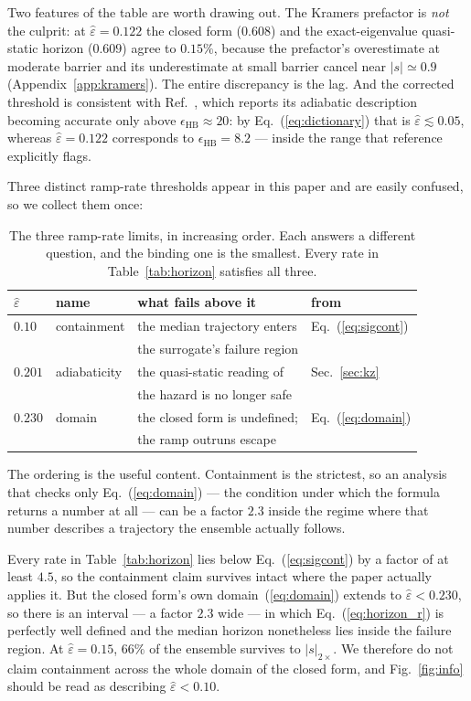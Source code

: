 \documentclass[%
 aip,
 cha,
 amsmath,amssymb,
 reprint,
 superscriptaddress,
 floatfix,
]{revtex4-2}
\newcommand{\Sig}{\hat\varepsilon}
\begin{document}
Two features of the table are worth drawing out.  The Kramers prefactor is \emph{not} the culprit: at $\Sig=0.122$ the closed form ($0.608$) and the exact-eigenvalue quasi-static horizon ($0.609$) agree to $0.15\%$, because the prefactor's overestimate at moderate barrier and its underestimate at small barrier cancel near $|s|\simeq0.9$ (Appendix~\ref{app:kramers}).  The entire discrepancy is the lag.  And the corrected threshold is consistent with Ref.~\cite{HerbertBouchet2017}, which reports its adiabatic description becoming accurate only above $\epsilon_{\mathrm{HB}}\approx20$: by Eq.~(\ref{eq:dictionary}) that is $\Sig\lesssim0.05$, whereas $\Sig=0.122$ corresponds to $\epsilon_{\mathrm{HB}}=8.2$ --- inside the range that reference explicitly flags.

Three distinct ramp-rate thresholds appear in this paper and are easily confused, so we collect them once:
\begin{table}[b]
\caption{\label{tab:thresholds}%
The three ramp-rate limits, in increasing order.  Each answers a different question, and the binding one is the smallest.  Every rate in Table~\ref{tab:horizon} satisfies all three.}
\begin{ruledtabular}
\begin{tabular}{llll}
$\Sig$ & name & what fails above it & from \\
\hline
$0.10$  & containment & the median trajectory enters & Eq.~(\ref{eq:sigcont}) \\
        &             & the surrogate's failure region & \\
$0.201$ & adiabaticity & the quasi-static reading of & Sec.~\ref{sec:kz} \\
        &              & the hazard is no longer safe & \\
$0.230$ & domain & the closed form is undefined; & Eq.~(\ref{eq:domain}) \\
        &        & the ramp outruns escape & \\
\end{tabular}
\end{ruledtabular}
\end{table}
The ordering is the useful content.  Containment is the strictest, so an analysis that checks only Eq.~(\ref{eq:domain}) --- the condition under which the formula returns a number at all --- can be a factor $2.3$ inside the regime where that number describes a trajectory the ensemble actually follows.

Every rate in Table~\ref{tab:horizon} lies below Eq.~(\ref{eq:sigcont}) by a factor of at least $4.5$, so the containment claim survives intact where the paper actually applies it.  But the closed form's own domain~(\ref{eq:domain}) extends to $\Sig<0.230$, so there is an interval --- a factor $2.3$ wide --- in which Eq.~(\ref{eq:horizon_r}) is perfectly well defined and the median horizon nonetheless lies inside the failure region.  At $\Sig=0.15$, $66\%$ of the ensemble survives to $|s|_{2\times}$.  We therefore do not claim containment across the whole domain of the closed form, and Fig.~\ref{fig:info} should be read as describing $\Sig<0.10$.
\end{document}
